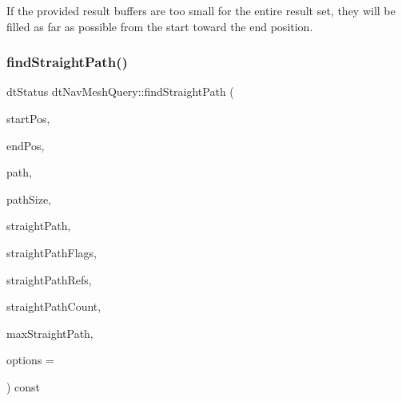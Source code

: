 If the provided result buffers are too small for the entire result set, they will be filled as far as possible from the start toward the end position. \mbox{\label{classdtNavMeshQuery_ac160434c85bdf9edec24fa621f120d2d}} 
\subsubsection{\texorpdfstring{find\+Straight\+Path()}{findStraightPath()}\hspace{0.1cm}{\footnotesize\ttfamily [2/2]}}
{\footnotesize\ttfamily dt\+Status dt\+Nav\+Mesh\+Query\+::find\+Straight\+Path (\begin{DoxyParamCaption}\item[{const float $\ast$}]{start\+Pos,  }\item[{const float $\ast$}]{end\+Pos,  }\item[{const \hyperlink{group__detour_gab4e0b2257a670c1a800057999612b466}{dt\+Poly\+Ref} $\ast$}]{path,  }\item[{const int}]{path\+Size,  }\item[{float $\ast$}]{straight\+Path,  }\item[{unsigned char $\ast$}]{straight\+Path\+Flags,  }\item[{\hyperlink{group__detour_gab4e0b2257a670c1a800057999612b466}{dt\+Poly\+Ref} $\ast$}]{straight\+Path\+Refs,  }\item[{int $\ast$}]{straight\+Path\+Count,  }\item[{const int}]{max\+Straight\+Path,  }\item[{const int}]{options = {} }\end{DoxyParamCaption}) const}

